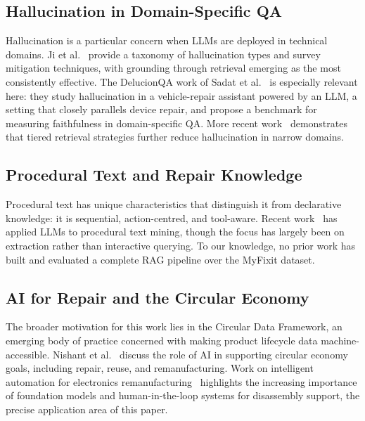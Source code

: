 \documentclass[journal,onecolumn]{IEEEtran}
\begin{document}
\subsection{Hallucination in Domain-Specific QA}

Hallucination is a particular concern when LLMs are deployed in technical
domains. Ji et al.~\cite{ji2023hallucination} provide a taxonomy of
hallucination types and survey mitigation techniques, with grounding through
retrieval emerging as the most consistently effective. The DelucionQA work of
Sadat et al.~\cite{delucionqa2023} is especially relevant here: they study
hallucination in a vehicle-repair assistant powered by an LLM, a setting that
closely parallels device repair, and propose a benchmark for measuring
faithfulness in domain-specific QA. More recent
work~\cite{domaingroundedretrieval2026} demonstrates that tiered retrieval
strategies further reduce hallucination in narrow domains.

\subsection{Procedural Text and Repair Knowledge}

Procedural text has unique characteristics that distinguish it from declarative
knowledge: it is sequential, action-centred, and tool-aware. Recent
work~\cite{proceduraltextmining2023} has applied LLMs to procedural text
mining, though the focus has largely been on extraction rather than
interactive querying. To our knowledge, no prior work has built and evaluated a
complete RAG pipeline over the MyFixit dataset.

\subsection{AI for Repair and the Circular Economy}

The broader motivation for this work lies in the Circular Data Framework, an
emerging body of practice concerned with making product lifecycle data
machine-accessible. Nishant et al.~\cite{aiCircular2022} discuss the role of
AI in supporting circular economy goals, including repair, reuse, and
remanufacturing. Work on intelligent automation for electronics
remanufacturing~\cite{remanufacturing2025} highlights the increasing
importance of foundation models and human-in-the-loop systems for disassembly
support, the precise application area of this paper.

\end{document}
